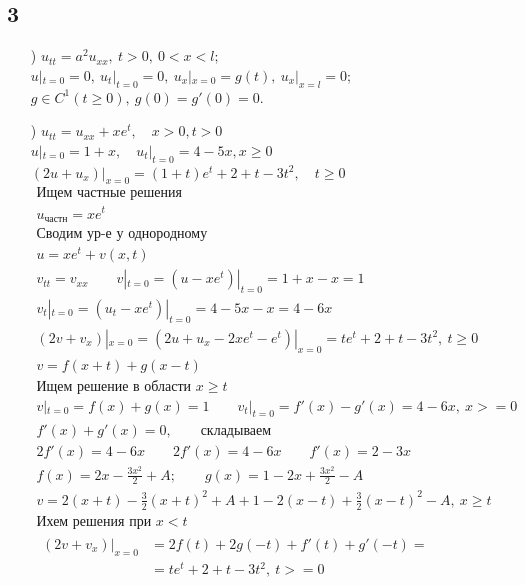 \subsection{3}
\begin{enumerate}
  \item[\text{а})] $u_{tt}=a^{2}u_{xx}, \ t>0, \ 0<x<l;$ \\
    $u|_{t=0}=0, \ u_{t}|_{t=0}=0, \ u_{x}|_{x=0}=g(t), \ u_{x}|_{x=l}=0;$ \\
    $g\in C^{1}(t \geq 0), \ g(0)=g'(0)=0.$ \\
  \item[\text{б})] $u_{tt} = u_{xx} +xe^{t}, \quad x>0,t>0$ \\
$u|_{t=0} = 1+x, \quad u_{t}|_{t=0} = 4-5x, x \geq 0$ \\
$(2u+u_{x})|_{x=0}=(1+t)e^{t}+2+t-3t^{2}, \quad t \geq 0$ \\
\begin{gather*}
  \text{Ищем частные решения} \\
  u_{\text{частн}} = xe^{t} \\
  \text{Сводим ур-е у однородному} \\
  u = xe^{t} + v(x,t) \\
  v_{tt} = v_{xx} \qquad v|_{t=0} = (u - xe^{t})|_{t=0} = 1+x-x=1 \\
  v_{t}|_{t=0}=(u_{t}-xe^{t})|_{t=0}=4-5x-x=4-6x \\
  (2v+v_{x})|_{x=0} = (2u+u_{x}-2xe^{t}-e^{t})|_{x=0} = te^{t}+2+t-3t^{2}, \ t \geq 0 \\
v = f(x+t) + g(x-t) \\
\text{Ищем решение в области $x \geq t$} \\
v|_{t=0} = f(x)+g(x) = 1 \qquad v_{t}|_{t=0} = f'(x) - g'(x) = 4 - 6x, \ x>= 0 \\
f'(x) + g'(x) = 0, \qquad \text{складываем} \\
2f'(x)=4-6x \qquad 2f'(x) = 4-6x \qquad f'(x) = 2-3x \\
\boxed{f(x)=2x -\frac{3x^{2}}{2}+A; \qquad g(x) = 1-2x+ \frac{3x^{2}}{2}-A} \\
v = 2(x+t) - \frac{3}{2}(x+t)^{2}+A+1-2(x-t)+ \frac{3}{2}(x-t)^{2}-A, \ x \geq t \\
\text{Ихем решения при $x < t$} \\
\begin{split}
  (2v+v_{x})|_{x=0} &= 2f(t)+2g(-t)+ f'(t) + g'(-t) = \\
                    &= te^{t} +2+t -3t^{2}, \ t>= 0 \\

\end{split}
\end{gather*}
\end{enumerate}
